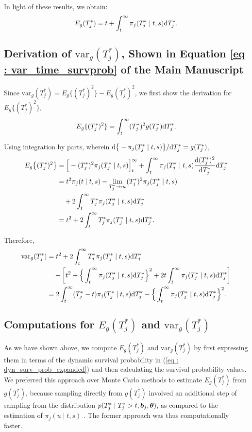 In light of these results, we obtain:
\begin{equation*}
E_g(T^*_j) = t + \int_t^{\infty} \pi_j(T^*_j \mid t, s) \mathrm{d} T^*_j.
\end{equation*}

\subsection{Derivation of $\mbox{var}_g(T^*_j)$, Shown in Equation \ref{eq : var_time_survprob} of the Main Manuscript}
Since $\mbox{var}_g(T^*_j) = E_g\{(T^*_j)^2\} - E_g(T^*_j)^2$, we first show the derivation for $E_g\{(T^*_j)^2\}$.
\begin{equation*}
E_g\{(T^*_j)^2\} = \int_t^{\infty} (T^*_j)^2 g(T^*_j)\mathrm{d} T^*_j.
\end{equation*}

Using integration by parts, wherein ${\mathrm{d} \big\{-\pi_j(T^*_j \mid t, s)\big\}}/{\mathrm{d} T^*_j} = g(T^*_j)$,
\begin{equation*}
\begin{split}
E_g\big\{(T^*_j)^2\big\} &= \Big[-(T^*_j)^2\pi_j(T^*_j \mid t, s)\Big]_t^\infty + \int_t^{\infty} \pi_j(T^*_j \mid t, s) \frac{\mathrm{d} (T^*_j)^2}{\mathrm{d} T^*_j} \mathrm{d} T^*_j\\
&= t^2 \pi_j(t \mid t, s) - \lim_{T^*_j\to \infty}(T^*_j)^2 \pi_j(T^*_j \mid t, s) \\& \quad + 2 \int_t^{\infty} T^*_j \pi_j(T^*_j \mid t, s) \mathrm{d} T^*_j\\
&= t^2 + 2 \int_t^{\infty} T^*_j \pi_j(T^*_j \mid t, s) \mathrm{d} T^*_j.
\end{split}
\end{equation*}

Therefore,
\begin{equation*}
\begin{split}
\mbox{var}_g(T^*_j) &= t^2 + 2 \int_t^{\infty} T^*_j \pi_j(T^*_j \mid t, s) \mathrm{d} T^*_j \\ & \quad - \bigg[t^2 +  \Big\{\int_t^\infty \pi_j(T^*_j \mid t, s) \mathrm{d} T^*_j \Big\}^2 + 2t\int_t^\infty \pi_j(T^*_j \mid t, s) \mathrm{d} T^*_j \bigg]\\
&=2 \int_t^{\infty} (T^*_j - t) \pi_j(T^*_j \mid t, s) \mathrm{d} T^*_j -  \Big\{\int_t^\infty \pi_j(T^*_j \mid t, s) \mathrm{d} T^*_j \Big\}^2.
\end{split}
\end{equation*}

\subsection{Computations for $E_g(T^*_j)$ and $\mbox{var}_g(T^*_j)$}
As we have shown above, we compute $E_g(T^*_j)$ and $\mbox{var}_g(T^*_j)$ by first expressing them in terms of the dynamic survival probability in (\ref{eq : dyn_surv_prob_expanded}) and then calculating the survival probability values. We preferred this approach over Monte Carlo methods to estimate $E_g(T^*_j)$ from $g(T^*_j)$, because sampling directly from $g(T^*_j)$ involved an additional step of sampling from the distribution $p(T^*_j \mid T^*_j > t, \boldsymbol{b}_j, \boldsymbol{\theta})$, as compared to the estimation of $\pi_j(u \mid t, s)$ \citep{rizopoulos2011dynamic}. The former approach was thus computationally faster.